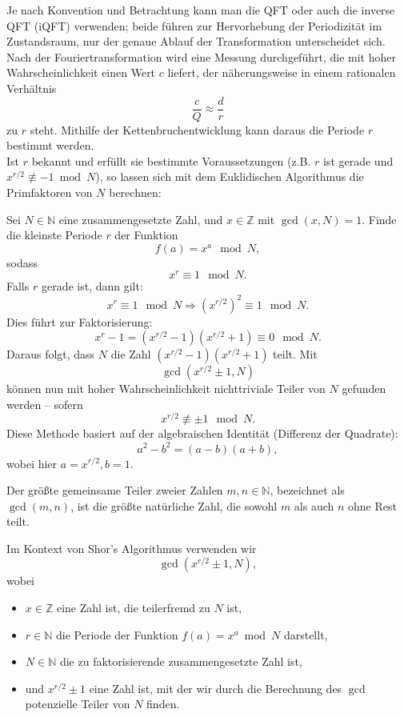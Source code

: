 Je nach Konvention und Betrachtung kann man die QFT oder auch die inverse QFT (iQFT) verwenden; beide führen zur Hervorhebung der Periodizität im Zustandsraum, nur der genaue Ablauf der Transformation unterscheidet sich.\\

Nach der Fouriertransformation wird eine Messung durchgeführt, die mit hoher Wahrscheinlichkeit einen Wert \( c \) liefert, der näherungsweise in einem rationalen Verhältnis  
\[
\frac{c}{Q} \approx \frac{d}{r}
\]
zu \( r \) steht. Mithilfe der Kettenbruchentwicklung kann daraus die Periode \( r \) bestimmt werden.\\

Ist \( r \) bekannt und erfüllt sie bestimmte Voraussetzungen (z.B. \( r \) ist gerade und \( x^{r/2} \not\equiv -1 \bmod N \)), so lassen sich mit dem Euklidischen Algorithmus die Primfaktoren von \( N \) berechnen: 

Sei \( N \in \mathbb{N} \) eine zusammengesetzte Zahl, und \( x \in \mathbb{Z} \) mit \(\gcd(x, N) = 1\).  
Finde die kleinste Periode \( r \) der Funktion
\[
f(a) = x^a \mod N,
\]
sodass
\[
x^r \equiv 1 \mod N.
\]
Falls \( r \) gerade ist, dann gilt:
\[
x^r \equiv 1 \mod N \Rightarrow (x^{r/2})^2 \equiv 1 \mod N.
\]
Dies führt zur Faktorisierung:
\[
x^r - 1 = (x^{r/2} - 1)(x^{r/2} + 1) \equiv 0 \mod N.
\]
Daraus folgt, dass \( N \) die Zahl \( (x^{r/2} - 1)(x^{r/2} + 1) \) teilt.
Mit
\[
\gcd(x^{r/2} \pm 1, N)
\]
können nun mit hoher Wahrscheinlichkeit nichttriviale Teiler von \( N \) gefunden werden – sofern
\[
x^{r/2} \not\equiv \pm 1 \mod N.
\]
Diese Methode basiert auf der algebraischen Identität (Differenz der Quadrate):
\[
a^2 - b^2 = (a - b)(a + b),
\]
wobei hier \( a = x^{r/2}, b = 1 \).

\begin{definition}\label{def:ggT}
Der größte gemeinsame Teiler zweier Zahlen \(m, n \in \mathbb{N}\), bezeichnet als \(\gcd(m,n)\), ist die größte natürliche Zahl, die sowohl \(m\) als auch \(n\) ohne Rest teilt.

Im Kontext von Shor's Algorithmus verwenden wir
\[
\gcd\left(x^{r/2} \pm 1, N\right),
\]
wobei
\begin{itemize}
    \item \(x \in \mathbb{Z}\) eine Zahl ist, die teilerfremd zu \(N\) ist,
    \item \(r \in \mathbb{N}\) die Periode der Funktion \(f(a) = x^a \bmod N\) darstellt,
    \item \(N \in \mathbb{N}\) die zu faktorisierende zusammengesetzte Zahl ist,
    \item und \(x^{r/2} \pm 1\) eine Zahl ist, mit der wir durch die Berechnung des \(\gcd\) potenzielle Teiler von \(N\) finden.
\end{itemize}
\end{definition}

